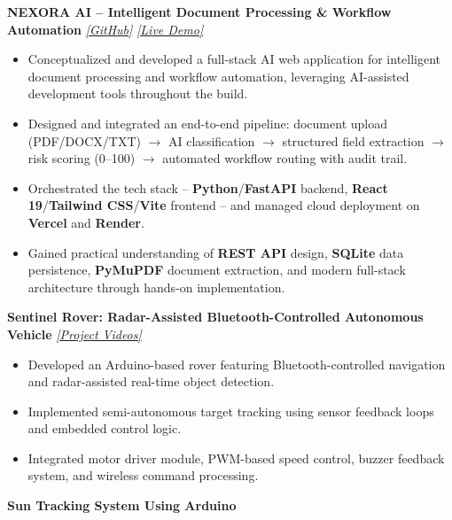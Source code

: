 \documentclass[a4paper,10pt]{article}
\begin{document}
\textbf{NEXORA AI -- Intelligent Document Processing \& Workflow Automation}
\hfill
\href{https://github.com/imdeepx11/NEXORA-AI}{\textit{[GitHub]}}
\enspace
\href{https://nexora-ai-imdeepx11.vercel.app/}{\textit{[Live Demo]}}

\begin{itemize}
    \item Conceptualized and developed a full-stack AI web application for intelligent document processing and workflow automation, leveraging AI-assisted development tools throughout the build.
    \item Designed and integrated an end-to-end pipeline: document upload (PDF/DOCX/TXT) $\rightarrow$ AI classification $\rightarrow$ structured field extraction $\rightarrow$ risk scoring (0--100) $\rightarrow$ automated workflow routing with audit trail.
    \item Orchestrated the tech stack -- \textbf{Python}/\textbf{FastAPI} backend, \textbf{React 19}/\textbf{Tailwind CSS}/\textbf{Vite} frontend -- and managed cloud deployment on \textbf{Vercel} and \textbf{Render}.
    \item Gained practical understanding of \textbf{REST API} design, \textbf{SQLite} data persistence, \textbf{PyMuPDF} document extraction, and modern full-stack architecture through hands-on implementation.
\end{itemize}

\vspace{2pt}

\textbf{Sentinel Rover: Radar-Assisted Bluetooth-Controlled Autonomous Vehicle}
\hfill
\href{https://drive.google.com/drive/folders/1aF45gX7f-_E48fL2EvL6yxTDeOj20PwY?usp=sharing}{\textit{[Project Videos]}}

\begin{itemize}
    \item Developed an Arduino-based rover featuring Bluetooth-controlled navigation and radar-assisted real-time object detection.
    \item Implemented semi-autonomous target tracking using sensor feedback loops and embedded control logic.
    \item Integrated motor driver module, PWM-based speed control, buzzer feedback system, and wireless command processing.
\end{itemize}

\vspace{2pt}

\textbf{Sun Tracking System Using Arduino}
\end{document}
